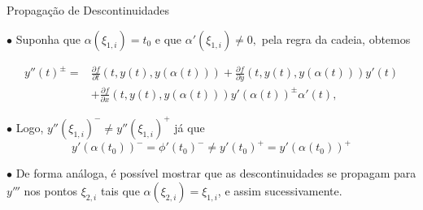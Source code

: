 \documentclass{beamer}
\theoremstyle{plain}
\newtheorem{teo}{Teorema}
\theoremstyle{definition}
\begin{document}

\begin{frame}{Propagação de Descontinuidades}

    $\bullet$ Suponha que $\alpha(\xi_{1, i}) = t_0 $ e que $ \alpha'(\xi_{1, i}) \neq 0, $ pela regra da cadeia, obtemos

    \footnotesize
    \begin{equation}
        \begin{aligned}
            y''(t)^{ \pm}= & \frac{\partial f}{\partial t}(t, y(t), y(\alpha(t)))+\frac{\partial f}{\partial y}(t, y(t), y(\alpha(t))) y'(t) \\
                           & +\frac{\partial f}{\partial x}(t, y(t), y(\alpha(t))) y'(\alpha(t))^{ \pm} \alpha'(t),
        \end{aligned}
        \label{chap2:eq:EDR:chain_rule}
    \end{equation}

    \normalsize
    $\bullet$ Logo, \(y''(\xi_{1, i})^- \neq y''(\xi_{1, i})^+\) já que 
    \[y'(\alpha(t_0))^- = \phi'(t_{0})^{-} \neq y'(t_{0})^{+} = y' (\alpha(t_0))^+ \]

    $\bullet$ De forma análoga, é possível mostrar que as descontinuidades se propagam para $y'''$ nos pontos $\xi_{2, i}$ tais que $\alpha(\xi_{2, i}) = \xi_{1, i}$, e assim sucessivamente. 

\end{frame}



%
%
%
%
%
\end{document}
